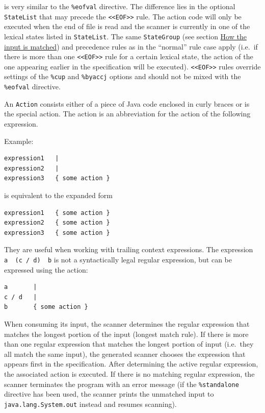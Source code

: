 is very similar to the \texttt{\%eofval} directive. The difference lies
in the optional \texttt{StateList} that may precede the
\texttt{\textless{}\textless{}EOF\textgreater{}\textgreater{}} rule. The
action code will only be executed when the end of file is read and the
scanner is currently in one of the lexical states listed in
\texttt{StateList}. The same \texttt{StateGroup} (see section
\hyperref[HowMatched]{How the input is matched}) and precedence rules as
in the ``normal'' rule case apply (i.e.~if there is more than one
\texttt{\textless{}\textless{}EOF\textgreater{}\textgreater{}} rule for
a certain lexical state, the action of the one appearing earlier in the
specification will be executed).
\texttt{\textless{}\textless{}EOF\textgreater{}\textgreater{}} rules
override settings of the \texttt{\%cup} and \texttt{\%byaccj} options
and should not be mixed with the \texttt{\%eofval} directive.

An \texttt{Action} consists either of a piece of Java code enclosed in
curly braces or is the special \texttt{\textbar{}} action. The
\texttt{\textbar{}} action is an abbreviation for the action of the
following expression.

Example:

\begin{verbatim}
expression1   |
expression2   |
expression3   { some action }
\end{verbatim}

is equivalent to the expanded form

\begin{verbatim}
expression1   { some action }
expression2   { some action }
expression3   { some action }
\end{verbatim}

They are useful when working with trailing context expressions. The
expression \texttt{a\ \textbar{}\ (c\ /\ d)\ \textbar{}\ b} is not a
syntactically legal regular expression, but can be expressed using the
\texttt{\textbar{}} action:

\begin{verbatim}
a       |
c / d   |
b       { some action }
\end{verbatim}


When consuming its input, the scanner determines the regular expression
that matches the longest portion of the input (longest match rule). If
there is more than one regular expression that matches the longest
portion of input (i.e.~they all match the same input), the generated
scanner chooses the expression that appears first in the specification.
After determining the active regular expression, the associated action
is executed. If there is no matching regular expression, the scanner
terminates the program with an error message (if the
\texttt{\%standalone} directive has been used, the scanner prints the
unmatched input to \texttt{java.lang.System.out} instead and resumes
scanning).

